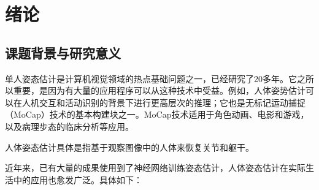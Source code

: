 
\chapter{绪论}

\section{课题背景与研究意义}
单人姿态估计是计算机视觉领域的热点基础问题之一，已经研究了20多年。它之所以重要，是因为有大量的应用程序可以从这种技术中受益。例如，人体姿势估计可以在人机交互和活动识别的背景下进行更高层次的推理；它也是无标记运动捕捉（MoCap）技术的基本构建块之一。MoCap技术适用于角色动画、电影和游戏，以及病理步态的临床分析等应用。

人体姿态估计具体是指基于观察图像中的人体来恢复关节和躯干。\cite{杨川2019基于深度学习的人体姿态估计技术研究}

近年来，已有大量的成果使用到了神经网络训练姿态估计，人体姿态估计在实际生活中的应用也愈发广泛。具体如下：

